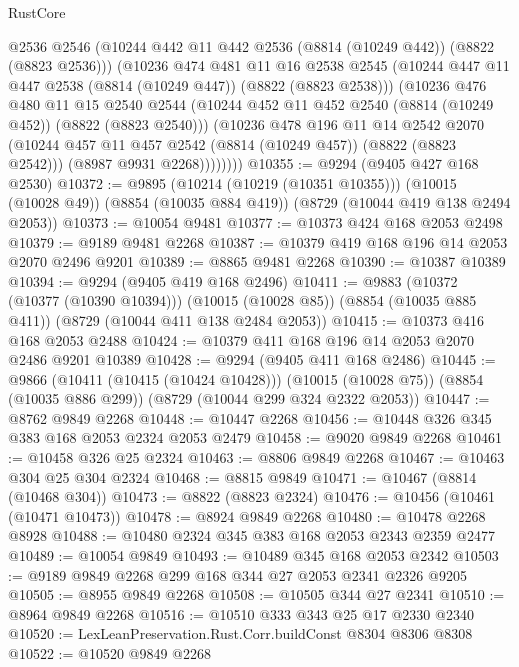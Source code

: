 \begin{lexlean}{RustCore}
\begin{coremodule}
            @2536
            @2546
            (@10244 @442 @11 @442 @2536 (@8814 (@10249 @442)) (@8822 (@8823 @2536)))
            (@10236
              @474
              @481
              @11
              @16
              @2538
              @2545
              (@10244 @447 @11 @447 @2538 (@8814 (@10249 @447)) (@8822 (@8823 @2538)))
              (@10236
                @476
                @480
                @11
                @15
                @2540
                @2544
                (@10244 @452 @11 @452 @2540 (@8814 (@10249 @452)) (@8822 (@8823 @2540)))
                (@10236
                  @478
                  @196
                  @11
                  @14
                  @2542
                  @2070
                  (@10244 @457 @11 @457 @2542 (@8814 (@10249 @457)) (@8822 (@8823 @2542)))
                  (@8987 @9931 @2268))))))))
@10355 := @9294 (@9405 @427 @168 @2530)
@10372 := @9895
    (@10214 (@10219 (@10351 @10355)))
    (@10015 (@10028 @49))
    (@8854 (@10035 @884 @419))
    (@8729 (@10044 @419 @138 @2494 @2053))
@10373 := @10054 @9481
@10377 := @10373 @424 @168 @2053 @2498
@10379 := @9189 @9481 @2268
@10387 := @10379 @419 @168 @196 @14 @2053 @2070 @2496 @9201
@10389 := @8865 @9481 @2268
@10390 := @10387 @10389
@10394 := @9294 (@9405 @419 @168 @2496)
@10411 := @9883
    (@10372 (@10377 (@10390 @10394)))
    (@10015 (@10028 @85))
    (@8854 (@10035 @885 @411))
    (@8729 (@10044 @411 @138 @2484 @2053))
@10415 := @10373 @416 @168 @2053 @2488
@10424 := @10379 @411 @168 @196 @14 @2053 @2070 @2486 @9201 @10389
@10428 := @9294 (@9405 @411 @168 @2486)
@10445 := @9866
    (@10411 (@10415 (@10424 @10428)))
    (@10015 (@10028 @75))
    (@8854 (@10035 @886 @299))
    (@8729 (@10044 @299 @324 @2322 @2053))
@10447 := @8762 @9849 @2268
@10448 := @10447 @2268
@10456 := @10448 @326 @345 @383 @168 @2053 @2324 @2053 @2479
@10458 := @9020 @9849 @2268
@10461 := @10458 @326 @25 @2324
@10463 := @8806 @9849 @2268
@10467 := @10463 @304 @25 @304 @2324
@10468 := @8815 @9849
@10471 := @10467 (@8814 (@10468 @304))
@10473 := @8822 (@8823 @2324)
@10476 := @10456 (@10461 (@10471 @10473))
@10478 := @8924 @9849 @2268
@10480 := @10478 @2268 @8928
@10488 := @10480 @2324 @345 @383 @168 @2053 @2343 @2359 @2477
@10489 := @10054 @9849
@10493 := @10489 @345 @168 @2053 @2342
@10503 := @9189 @9849 @2268 @299 @168 @344 @27 @2053 @2341 @2326 @9205
@10505 := @8955 @9849 @2268
@10508 := @10505 @344 @27 @2341
@10510 := @8964 @9849 @2268
@10516 := @10510 @333 @343 @25 @17 @2330 @2340
@10520 := LexLeanPreservation.Rust.Corr.buildConst @8304 @8306 @8308
@10522 := @10520 @9849 @2268

\end{coremodule}
\end{lexlean}
